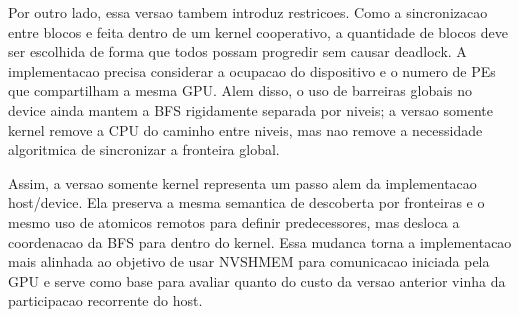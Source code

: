 Por outro lado, essa versao tambem introduz restricoes. Como a sincronizacao
entre blocos e feita dentro de um kernel cooperativo, a quantidade de blocos deve
ser escolhida de forma que todos possam progredir sem causar deadlock. A
implementacao precisa considerar a ocupacao do dispositivo e o numero de PEs que
compartilham a mesma GPU. Alem disso, o uso de barreiras globais no device ainda
mantem a BFS rigidamente separada por niveis; a versao somente kernel remove a
CPU do caminho entre niveis, mas nao remove a necessidade algoritmica de
sincronizar a fronteira global.

Assim, a versao somente kernel representa um passo alem da implementacao
host/device. Ela preserva a mesma semantica de descoberta por fronteiras e o
mesmo uso de atomicos remotos para definir predecessores, mas desloca a
coordenacao da BFS para dentro do kernel. Essa mudanca torna a implementacao
mais alinhada ao objetivo de usar NVSHMEM para comunicacao iniciada pela GPU e
serve como base para avaliar quanto do custo da versao anterior vinha da
participacao recorrente do host.
